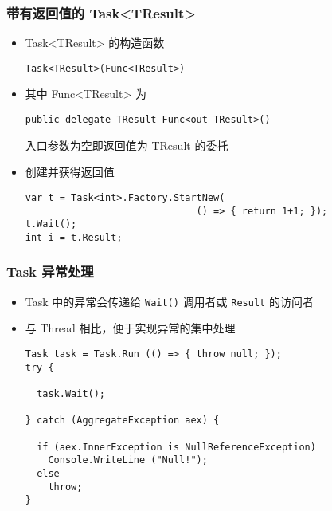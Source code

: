 \begin{frame}[fragile]
\frametitle{带有返回值的 Task<TResult>}
\begin{itemize}
\item Task<TResult> 的构造函数
\begin{lstlisting}
Task<TResult>(Func<TResult>)
\end{lstlisting}
\item 其中 Func<TResult> 为
\begin{lstlisting}
public delegate TResult Func<out TResult>()
\end{lstlisting}
入口参数为空即返回值为 TResult 的委托
\item 创建并获得返回值
\begin{lstlisting}
var t = Task<int>.Factory.StartNew(
                              () => { return 1+1; });
t.Wait();
int i = t.Result;
\end{lstlisting}
\end{itemize}

\end{frame}


\begin{frame}[fragile]
\frametitle{Task 异常处理}

\begin{itemize}
\item Task 中的异常会传递给 \texttt{Wait()} 调用者或 \texttt{Result} 的访问者
\item 与 Thread 相比，便于实现异常的集中处理
\begin{lstlisting}
Task task = Task.Run (() => { throw null; });
try {

  task.Wait();

} catch (AggregateException aex) {

  if (aex.InnerException is NullReferenceException)
    Console.WriteLine ("Null!");
  else
    throw;
}
\end{lstlisting}
\end{itemize}

\end{frame}



